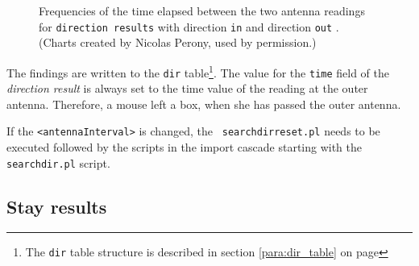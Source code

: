 \begin{figure}[htpb]%
	\centering 
	\qquad 
	\caption[Frequencies of the elapsed time between the antenna readings of direction results]{Frequencies of the time elapsed between the two antenna readings for \lstinline|direction results| with direction \lstinline|in|  and direction \lstinline|out| . \footnotesize(Charts created by Nicolas Perony, used by permission.)} 
	 
\end{figure}

The findings are written to the \lstinline|dir| table\footnote{The \lstinline|dir| table structure is described in section \ref{para:dir_table} on page \pageref{para:dir_table}}. The value for the \lstinline|time| field of the \textit{direction result} is always set to the time value of the reading at the outer antenna. Therefore, a  mouse left a box, when she has passed the outer antenna.

If the \lstinline|<antennaInterval>| is changed, the \lstinline| searchdirreset.pl| needs to be executed followed by the scripts in the import cascade starting with the \lstinline|searchdir.pl| script.

\subsection{Stay results}
\label{subsec:stayres}

